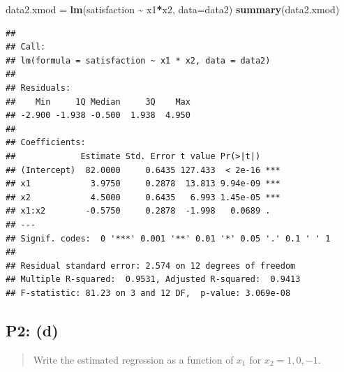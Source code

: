\documentclass[
]{article}
\newenvironment{Shaded}{\begin{snugshade}}{\end{snugshade}}
\newcommand{\AttributeTok}[1]{\textcolor[rgb]{0.13,0.29,0.53}{#1}}
\newcommand{\FunctionTok}[1]{\textcolor[rgb]{0.13,0.29,0.53}{\textbf{#1}}}
\newcommand{\NormalTok}[1]{#1}
\newcommand{\OtherTok}[1]{\textcolor[rgb]{0.56,0.35,0.01}{#1}}
\newcommand{\SpecialCharTok}[1]{\textcolor[rgb]{0.81,0.36,0.00}{\textbf{#1}}}
\begin{document}
\begin{Shaded}
\begin{Highlighting}[]
\NormalTok{data2.xmod }\OtherTok{=} \FunctionTok{lm}\NormalTok{(satisfaction }\SpecialCharTok{\textasciitilde{}}\NormalTok{ x1}\SpecialCharTok{*}\NormalTok{x2, }\AttributeTok{data=}\NormalTok{data2)}
\FunctionTok{summary}\NormalTok{(data2.xmod)}
\end{Highlighting}
\end{Shaded}

\begin{verbatim}
## 
## Call:
## lm(formula = satisfaction ~ x1 * x2, data = data2)
## 
## Residuals:
##    Min     1Q Median     3Q    Max 
## -2.900 -1.938 -0.500  1.938  4.950 
## 
## Coefficients:
##             Estimate Std. Error t value Pr(>|t|)    
## (Intercept)  82.0000     0.6435 127.433  < 2e-16 ***
## x1            3.9750     0.2878  13.813 9.94e-09 ***
## x2            4.5000     0.6435   6.993 1.45e-05 ***
## x1:x2        -0.5750     0.2878  -1.998   0.0689 .  
## ---
## Signif. codes:  0 '***' 0.001 '**' 0.01 '*' 0.05 '.' 0.1 ' ' 1
## 
## Residual standard error: 2.574 on 12 degrees of freedom
## Multiple R-squared:  0.9531, Adjusted R-squared:  0.9413 
## F-statistic: 81.23 on 3 and 12 DF,  p-value: 3.069e-08
\end{verbatim}

\hypertarget{p2-d}{%
\subsection{P2: (d)}\label{p2-d}}

\begin{quote}
Write the estimated regression as a function of \(x_1\) for
\(x_2 = 1,0,-1\).
\end{quote}
\end{document}
